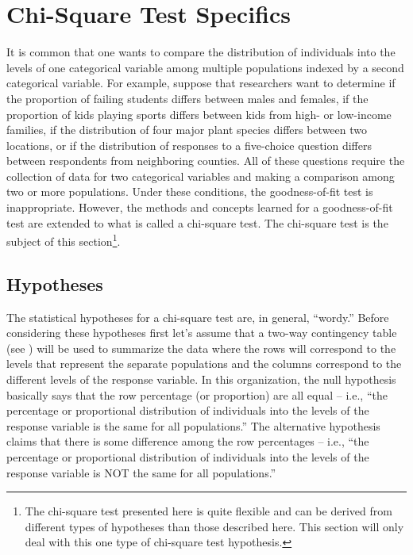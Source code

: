 \documentclass[10pt,openany]{book}\usepackage[]{graphicx}\usepackage[]{color}
\begin{document}
\section{Chi-Square Test Specifics}
It is common that one wants to compare the distribution of individuals into the levels of one categorical variable among multiple populations indexed by a second categorical variable.  For example, suppose that researchers want to determine if the proportion of failing students differs between males and females, if the proportion of kids playing sports differs between kids from high- or low-income families, if the distribution of four major plant species differs between two locations, or if the distribution of responses to a five-choice question differs between respondents from neighboring counties.  All of these questions require the collection of data for two categorical variables and making a comparison among two or more populations.  Under these conditions, the goodness-of-fit test is inappropriate.  However, the methods and concepts learned for a goodness-of-fit test are extended to what is called a chi-square test.  The chi-square test is the subject of this section\footnote{The chi-square test presented here is quite flexible and can be derived from different types of hypotheses than those described here.  This section will only deal with this one type of chi-square test hypothesis.}.


\subsection{Hypotheses}
The statistical hypotheses for a chi-square test are, in general, ``wordy.''  Before considering these hypotheses first let's assume that a two-way contingency table (see ) will be used to summarize the data where the rows will correspond to the levels that represent the separate populations and the columns correspond to the different levels of the response variable.  In this organization, the null hypothesis basically says that the row percentage (or proportion) are all equal -- i.e., ``the percentage or proportional distribution of individuals into the levels of the response variable is the same for all populations.''  The alternative hypothesis claims that there is some difference among the row percentages -- i.e., ``the percentage or proportional distribution of individuals into the levels of the response variable is NOT the same for all populations.''
\end{document}
